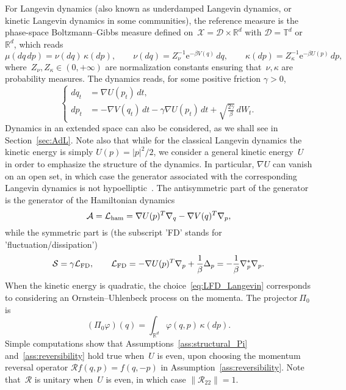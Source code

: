 \documentclass{article}
\newcommand{\rme}{\mathrm{e}}
\newcommand{\cLs}{\mathcal{S}}
\newcommand{\cLa}{\mathcal{A}}
\newcommand{\cLham}{\mathcal{L}_{\rm ham}}
\newcommand{\cLFD}{\mathcal{L}_{\rm FD}}
\newcommand{\cX}{\mathcal{X}}
\newcommand{\cD}{\mathcal{D}}
\newcommand{\R}{\mathbb{R}}
\newcommand{\cR}{\mathcal{R}}
\begin{document}
For Langevin dynamics (also known as underdamped Langevin dynamics, or kinetic Langevin dynamics in some communities), the reference measure is the phase-space Boltzmann--Gibbs measure defined on~$\cX = \cD \times \R^d$ with $\cD = \mathbb{T}^d$ or~$\mathbb{R}^d$, which reads
\begin{equation}
    \label{eq:canonical_U_V}
\mu(dq\,dp) = \nu(dq)\,\kappa(dp), \qquad \nu(dq) = Z_\nu^{-1} \rme^{-\beta V(q)} \,dq, \qquad \kappa(dp) = Z_\kappa^{-1} \rme^{-\beta U(p)} \,dp,
\end{equation}
where~$Z_\nu,Z_\kappa \in (0,+\infty)$ are normalization constants ensuring that~$\nu,\kappa$ are probability measures. The dynamics reads, for some positive friction $\gamma > 0$,
\[
\left\{
\begin{aligned}
dq_t & = \nabla U(p_t) \, dt, \\
dp_t & = -\nabla V(q_t) \, dt - \gamma \nabla U(p_t) \, dt + \sqrt{\frac{2\gamma}{\beta}} \, dW_t.
\end{aligned}
\right.
\]
Dynamics in an extended space can also be considered, as we shall see in Section~\ref{sec:AdL}. Note also that while for the classical Langevin dynamics the kinetic energy is simply $U(p) = |p|^2/2$, we consider a general kinetic energy~$U$ in order to emphasize the structure of the dynamics. In particular, $\nabla U$ can vanish on an open set, in which case the generator associated with the corresponding Langevin dynamics is not hypoelliptic~\cite{ST18}. The antisymmetric part of the generator is the generator of the Hamiltonian dynamics 
\begin{equation}
  \label{eq:Lham}
  \cLa = \cLham = \nabla U(p)^T \nabla_q - \nabla V(q)^T \nabla_p,
\end{equation}
while the symmetric part is (the subscript 'FD' stands for 'fluctuation/dissipation') 
\begin{equation}
  \label{eq:LFD_Langevin}
  \cLs = \gamma \cLFD,
  \qquad 
  \cLFD = -\nabla U(p)^T \nabla_p + \frac1\beta \Delta_p = -\frac1\beta \nabla_p^* \nabla_p.
\end{equation}
When the kinetic energy is quadratic, the choice~\eqref{eq:LFD_Langevin} corresponds to considering an Ornstein--Uhlenbeck process on the momenta. The projector$~\Pi_0$ is
\begin{equation}
  \label{eq:def_Pi}
  (\Pi_0 \varphi)(q) = \int_{\R^d} \varphi(q,p)\, \kappa(dp).
\end{equation}
Simple computations show that Assumptions~\ref{ass:structural_Pi} and~\ref{ass:reversibility} hold true when~$U$ is even, upon choosing the momentum reversal operator $\cR f(q, p) = f(q, -p)$ in Assumption~\ref{ass:reversibility}. Note that~$\cR$ is unitary when~$U$ is even, in which case $\|\cR_{22}\| = 1$.
\end{document}
